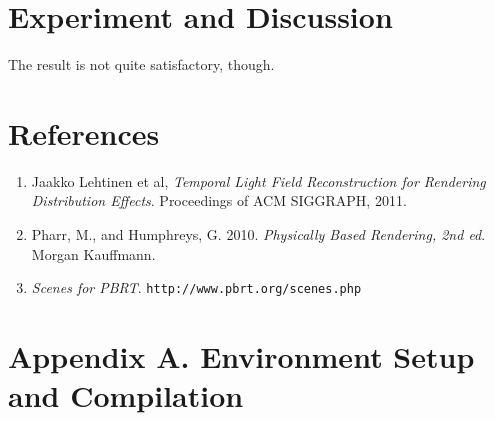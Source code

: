\documentclass{article}
\begin{document}
\section{Experiment and Discussion}
The result is not quite satisfactory, though.

\section{References}
\begin{enumerate}
\item Jaakko Lehtinen et al, \textit{Temporal Light Field Reconstruction for Rendering Distribution Effects}. Proceedings of ACM SIGGRAPH, 2011.
\item Pharr, M., and Humphreys, G. 2010. \textit{Physically Based Rendering, 2nd ed}. Morgan Kauffmann.
\item \textit{Scenes for PBRT}. \texttt{http://www.pbrt.org/scenes.php}

\end{enumerate}
\section*{Appendix A. Environment Setup and Compilation}
\end{document}
